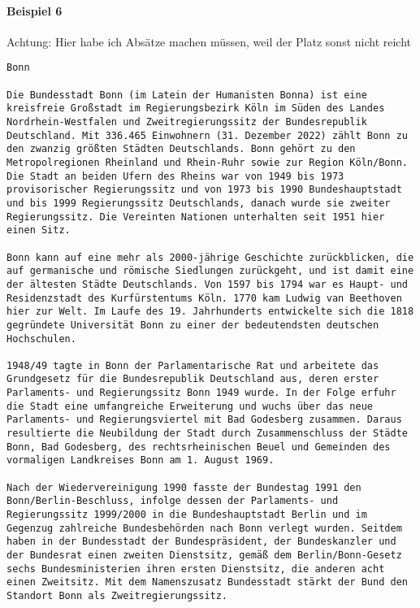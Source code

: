 \documentclass[a4paper,10pt,ngerman]{scrartcl}
\begin{document}
\paragraph{Beispiel 6}
Achtung: Hier habe ich Absätze machen müssen, weil der Platz sonst nicht reicht 
\begin{lstlisting}[frame=tb,breaklines=true]
Bonn

Die Bundesstadt Bonn (im Latein der Humanisten Bonna) ist eine kreisfreie Großstadt im Regierungsbezirk Köln im Süden des Landes Nordrhein-Westfalen und Zweitregierungssitz der Bundesrepublik Deutschland. Mit 336.465 Einwohnern (31. Dezember 2022) zählt Bonn zu den zwanzig größten Städten Deutschlands. Bonn gehört zu den Metropolregionen Rheinland und Rhein-Ruhr sowie zur Region Köln/Bonn. Die Stadt an beiden Ufern des Rheins war von 1949 bis 1973 provisorischer Regierungssitz und von 1973 bis 1990 Bundeshauptstadt und bis 1999 Regierungssitz Deutschlands, danach wurde sie zweiter Regierungssitz. Die Vereinten Nationen unterhalten seit 1951 hier einen Sitz.

Bonn kann auf eine mehr als 2000-jährige Geschichte zurückblicken, die auf germanische und römische Siedlungen zurückgeht, und ist damit eine der ältesten Städte Deutschlands. Von 1597 bis 1794 war es Haupt- und Residenzstadt des Kurfürstentums Köln. 1770 kam Ludwig van Beethoven hier zur Welt. Im Laufe des 19. Jahrhunderts entwickelte sich die 1818 gegründete Universität Bonn zu einer der bedeutendsten deutschen Hochschulen.

1948/49 tagte in Bonn der Parlamentarische Rat und arbeitete das Grundgesetz für die Bundesrepublik Deutschland aus, deren erster Parlaments- und Regierungssitz Bonn 1949 wurde. In der Folge erfuhr die Stadt eine umfangreiche Erweiterung und wuchs über das neue Parlaments- und Regierungsviertel mit Bad Godesberg zusammen. Daraus resultierte die Neubildung der Stadt durch Zusammenschluss der Städte Bonn, Bad Godesberg, des rechtsrheinischen Beuel und Gemeinden des vormaligen Landkreises Bonn am 1. August 1969.

Nach der Wiedervereinigung 1990 fasste der Bundestag 1991 den Bonn/Berlin-Beschluss, infolge dessen der Parlaments- und Regierungssitz 1999/2000 in die Bundeshauptstadt Berlin und im Gegenzug zahlreiche Bundesbehörden nach Bonn verlegt wurden. Seitdem haben in der Bundesstadt der Bundespräsident, der Bundeskanzler und der Bundesrat einen zweiten Dienstsitz, gemäß dem Berlin/Bonn-Gesetz sechs Bundesministerien ihren ersten Dienstsitz, die anderen acht einen Zweitsitz. Mit dem Namenszusatz Bundesstadt stärkt der Bund den Standort Bonn als Zweitregierungssitz.


\end{lstlisting}
\end{document}
